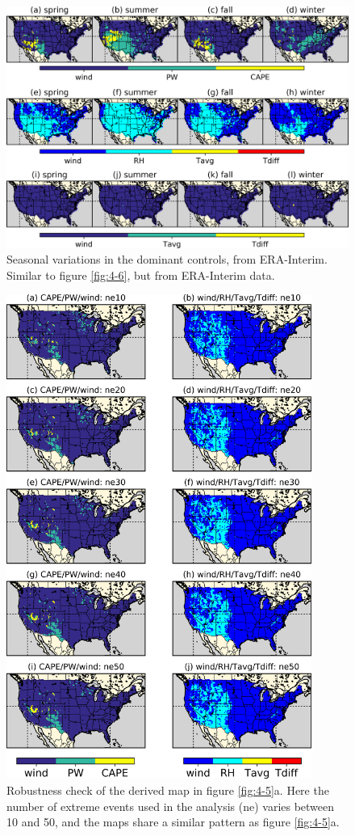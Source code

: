 \begin{figure}[htbp]
	\includegraphics[width=\linewidth]{pics/ch4/figS4.png}
	\caption{Seasonal variations in the dominant controls, from ERA-Interim. Similar to figure \ref{fig:4-6}, but from ERA-Interim data.}
	\label{fig:4-S4}
\end{figure}

\begin{figure}[htbp]
	\centering
	\includegraphics[width=10cm]{pics/ch4/figS5.png}
	\caption{Robustness check of the derived map in figure \ref{fig:4-5}a. Here the number of extreme events used in the analysis (ne) varies between 10 and 50, and the maps share a similar pattern as figure \ref{fig:4-5}a.}
	\label{fig:4-S5}
\end{figure}

